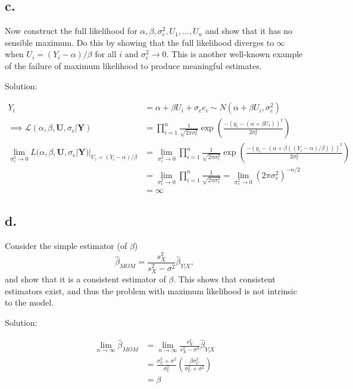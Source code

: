 \documentclass[
  letterpaper,
  DIV=11,
  numbers=noendperiod]{scrreprt}
\begin{document}
\hypertarget{c.-1}{%
\subsection{c.~}\label{c.-1}}

Now construct the full likelihood for
\(\alpha,\beta,\sigma_{\epsilon}^2, U_1,\dots,U_n\) and show that it has
no sensible maximum. Do this by showing that the full likelihood
diverges to \(\infty\) when \(U_i =(Y_i-\alpha)/\beta\) for all \(i\)
and \(\sigma_{\epsilon}^2 \to 0\). This is another well-known example of
the failure of maximum likelihood to produce meaningful estimates.

Solution:

\[ \begin{aligned}
Y_i &= \alpha + \beta U_i +\sigma_e e_i \sim N(\alpha + \beta U_i, \sigma_{e}^2) \\
\implies \mathcal L(\alpha, \beta, \mathbf U, \sigma_e | \mathbf Y) &= \prod_{i=1}^n \frac{1}{\sqrt{2 \pi \sigma_{e}^2}}\exp \left(\frac{-(y_i -(\alpha +\beta U_i))^2}{2\sigma_{e}^2}\right) \\
\lim_{\sigma^2_{e} \to 0}L(\alpha, \beta, \mathbf U, \sigma_e | \mathbf Y)|_{U_i =(Y_i-\alpha)/\beta} &=\lim_{\sigma^2_{e} \to 0} \prod_{i=1}^n \frac{1}{\sqrt{2 \pi \sigma_{e}^2}}\exp \left(\frac{-(y_i -(\alpha +\beta ((Y_i-\alpha)/\beta)))^2}{2\sigma_{e}^2}\right) \\
&=\lim_{\sigma^2_{e} \to 0}\prod_{i=1}^n \frac{1}{\sqrt{2 \pi \sigma_{e}^2}} = \lim_{\sigma^2_{e} \to 0} (2 \pi \sigma_{e}^2)^{-n/2} \\
&= \infty
\end{aligned} \]

\hypertarget{d.-1}{%
\subsection{d.}\label{d.-1}}

Consider the simple estimator (of \(\beta\))
\[\hat \beta_{MOM} = \frac{s_X^2}{s_X^2-\sigma^2} \hat \beta _{Y|X},\]
and show that it is a consistent estimator of \(\beta\). This shows that
consistent estimators exist, and thus the problem with maximum
likelihood is not intrinsic to the model.

Solution:

\[
\begin{aligned}
\lim_{n \to \infty}\hat \beta_{MOM} &= \lim_{n \to \infty}\frac{s_X^2}{s_X^2-\sigma^2} \hat \beta _{Y|X} \\
&=\frac{\sigma_U^2 + \sigma^2}{\sigma_U^2} \left(\frac{\beta \sigma_U^2}{\sigma_U^2+ \sigma^2}\right) \\
&=\beta
\end{aligned}
\] \newpage
\end{document}
